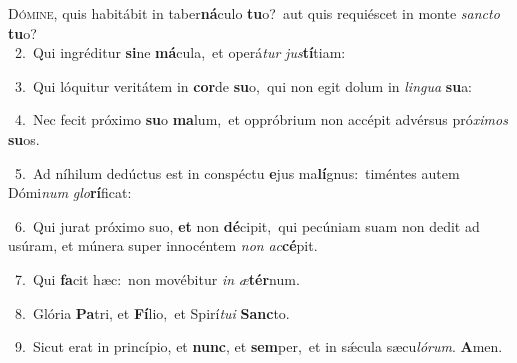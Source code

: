 \lettrine{\initial\textcolor{\initialcolor}{D}}{ómine,} quis habitábit in taber\-\textbf{ná}\-culo \textbf{tu}\-o?~\star aut quis requiéscet in monte \textit{sanc}\-\textit{to} \textbf{tu}\-o?\\
{\numbfont\textcolor{\numbcolor}{~2.}}~Qui ingréditur \textbf{si}\-ne \textbf{má}\-cula,~\star et operá\textit{tur} \textit{jus}\-\textbf{tí}tiam:\par
{\numbfont\textcolor{\numbcolor}{~3.}}~Qui lóquitur veritátem in \textbf{cor}\-de \textbf{su}\-o,~\star qui non egit dolum in \textit{lin}\-\textit{gua} \textbf{su}\-a:\par
{\numbfont\textcolor{\numbcolor}{~4.}}~Nec fecit próximo \textbf{su}\-o \textbf{ma}\-lum,~\star et oppróbrium non accépit advérsus pró\-\textit{xi}\-\textit{mos} \textbf{su}\-os.\par
{\numbfont\textcolor{\numbcolor}{~5.}}~Ad níhilum dedúctus est in conspéctu \textbf{e}\-jus ma\-\textbf{lí}\-gnus:~\star timéntes autem Dómi\textit{num} \textit{glo}\-\textbf{rí}ficat:\par
{\numbfont\textcolor{\numbcolor}{~6.}}~Qui jurat próximo suo, \textbf{et} non \textbf{dé}\-cipit,~\star qui pecúniam suam non dedit ad usúram, et múnera super innocéntem \textit{non} \textit{ac}\-\textbf{cé}pit.\par
{\numbfont\textcolor{\numbcolor}{~7.}}~Qui \textbf{fa}\-cit hæc:~\star non movébitur \textit{in} \textit{æ}\-\textbf{tér}num.\par
{\numbfont\textcolor{\numbcolor}{~8.}}~Glória \textbf{Pa}\-tri, et \textbf{Fí}\-lio,~\star et Spirí\-\textit{tu}\-\textit{i} \textbf{Sanc}\-to.\par
{\numbfont\textcolor{\numbcolor}{~9.}}~Sicut erat in princípio, et \textbf{nunc}\-, et \textbf{sem}\-per,~\star et in sǽcula sæcu\-\textit{ló}\-\textit{rum}. \textbf{A}\-men.\par
